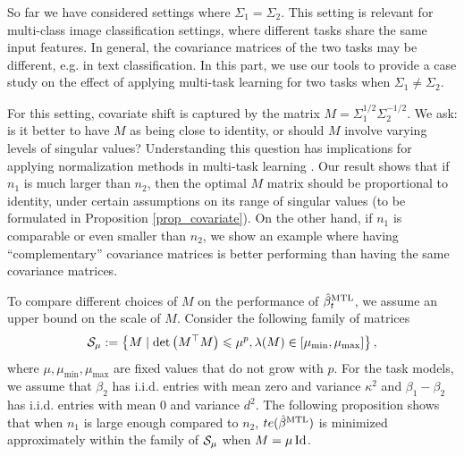 So far we have considered settings where $\Sigma_1 = \Sigma_2$.
This setting is relevant for multi-class image classification settings, where different tasks share the same input features.
In general, the covariance matrices of the two tasks may be different, e.g. in text classification.
In this part, we use our tools to provide a case study on the effect of applying multi-task learning for two tasks when $\Sigma_1 \neq \Sigma_2$.

For this setting, covariate shift is captured by the matrix $M = \Sigma_1^{1/2} \Sigma_2^{-1/2}$.
We ask: is it better to have $M$ as being close to identity, or should $M$ involve varying levels of singular values?
Understanding this question has implications for applying normalization methods in multi-task learning \cite{LV19,CBLR18,YKGLHF20}.
Our result shows that if $n_1$ is much larger than $n_2$, then the optimal $M$ matrix should be proportional to identity, under certain assumptions on its range of singular values (to be formulated in Proposition \ref{prop_covariate}).
On the other hand, if $n_1$ is comparable or even smaller than $n_2$, we show an example where having ``complementary'' covariance matrices is better performing than having the same covariance matrices.

\begin{example}\label{ex_cov_family}
	To compare different choices of $M$ on the performance of $\hat{\beta}_t^{\text{MTL}}$, we assume an upper bound on the scale of $M$.
	Consider the following family of matrices
	\begin{align*}
		\mathcal{S}_{\mu}:=\left\{ M \mid \det\left({ M^\top M}\right) \leqslant \mu^p, \lambda(M) \in [\mu_{\min}, \mu_{\max}] \right\},
	\end{align*}
	where $\mu, \mu_{\min}, \mu_{\max}$ are fixed values that do not grow with $p$.
	For the task models, we assume that $\beta_2$ has i.i.d. entries with mean zero and variance $\kappa^2$ and $\beta_1 - \beta_2$ has i.i.d. entries with mean $0$ and variance $d^2$.
	The following proposition shows that when $n_1$ is large enough compared to $n_2$, $te(\hat{\beta}^{\text{MTL}})$ is minimized approximately within the family of $\mathcal{S}_{\mu}$ when $M = \mu\operatorname{Id}$.
\end{example}


